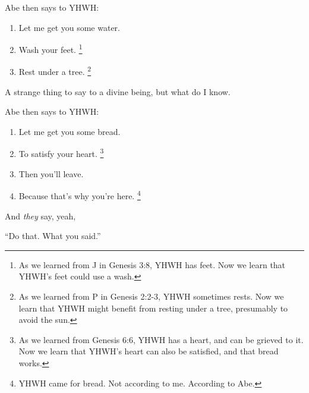 {
}
{
}
{
	Abe then says to YHWH:

	\begin{enumerate}
	\item Let me get you some water.
	\item Wash your feet.%
		\footnote{
		As we learned from J in Genesis 3:8, YHWH has feet.
		Now we learn that YHWH's feet could use a wash.
		}
	\item Rest under a tree.%
		\footnote{
		As we learned from P in Genesis 2:2-3, YHWH sometimes rests.
		Now we learn that YHWH might benefit from resting under a tree, presumably to avoid the sun.
		}
	\end{enumerate}
	
	A strange thing to say to a divine being, but what do I know.


}

{
}
{
}
{
	Abe then says to YHWH:

	\begin{enumerate}
	\item Let me get you some bread.
	\item To satisfy your heart.%
		\footnote{
			As we learned from Genesis 6:6, YHWH has a heart, and can be grieved to it.
			Now we learn that YHWH's heart can also be satisfied, and that bread works.
		}
	\item Then you'll leave.
	\item Because that's why you're here.%
		\footnote{YHWH came for bread. Not according to me. According to Abe.}
	\end{enumerate}

	And \textsl{they} say, yeah,

	“Do that. What you said.”
}

